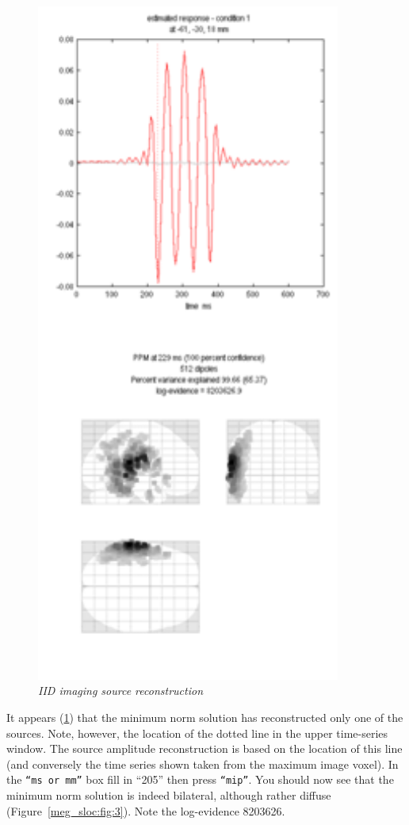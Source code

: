 \begin{figure}
\begin{center}
\includegraphics[width=100mm]{meg_sloc/Slide2}
\caption{\em IID imaging source reconstruction \label{meg_sloc:fig:2}}
\end{center}
\end{figure}

 
It appears (\ref{meg_sloc:fig:2}) that the minimum norm solution has reconstructed only one of the sources. Note, however, the location of the dotted line in the upper time-series window. The source amplitude reconstruction is based on the location of this line (and conversely the time series shown taken from the maximum image voxel). In the \texttt{``ms or mm''} box fill in ``205'' then press \texttt{``mip''}. You should now see that the minimum norm solution is indeed bilateral, although rather diffuse (Figure~\ref{meg_sloc:fig:3}).  Note the log-evidence 8203626.

